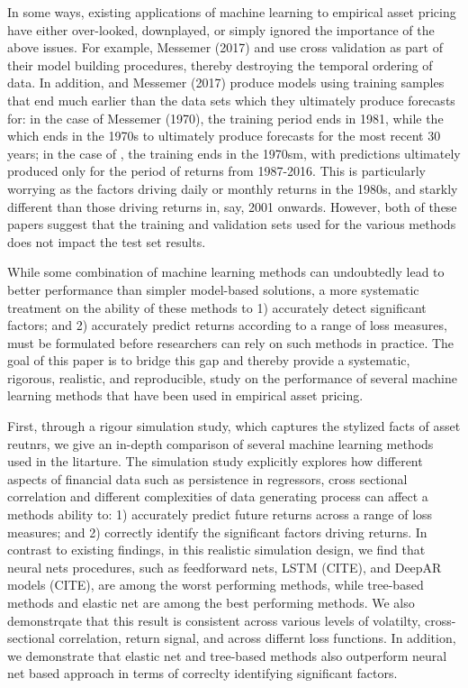 \documentclass{article}
\begin{document}
In some ways, existing applications of machine learning to empirical asset pricing have either over-looked, downplayed, or simply ignored the importance of the above issues. For example, Messemer (2017) and \cite{feng_deep_2018} use cross validation as part of their model building procedures, thereby destroying the temporal ordering of data. In addition, \cite{gu_empirical_2018} and Messemer (2017) produce models using training samples that end much earlier than the data sets which they ultimately produce forecasts for: in the case of Messemer (1970), the training period ends in 1981, while the  which ends in the 1970s to ultimately produce forecasts for the most recent 30 years; in the case of \cite{gu_empirical_2018}, the training ends in the 1970sm, with predictions ultimately produced only for the period of returns from 1987-2016.  This is particularly worrying as the factors driving daily or monthly returns in the 1980s, and starkly different than those driving returns in, say, 2001 onwards. However, both of these papers suggest that the training and validation sets used for the various methods does not impact the test set results. 


While some combination of machine learning methods can undoubtedly lead to better performance than simpler model-based solutions, a more systematic treatment on the ability of these methods to 1) accurately detect significant factors; and 2) accurately predict returns according to a range of loss measures, must be formulated before researchers can rely on such methods in practice. The goal of this paper is to bridge this gap and thereby provide a systematic, rigorous, realistic, and reproducible, study on the performance of several machine learning methods that have been used in empirical asset pricing. 

First, through a rigour simulation study, which captures the stylized facts of asset reutnrs, we give an in-depth comparison of several machine learning methods used in the litarture. The simulation study explicitly explores how different aspects of financial data such as persistence in regressors, cross sectional correlation and different complexities of data generating process can affect a methods ability to: 1) accurately predict future returns across a range of loss measures; and 2) correctly identify the significant factors driving returns. In contrast to existing findings, in this realistic simulation design, we find that neural nets procedures, such as feedforward nets, LSTM (CITE), and DeepAR models (CITE), are among the worst performing methods, while tree-based methods and elastic net are among the best performing methods. We also demonstrqate that this result is consistent across various levels of volatilty, cross-sectional correlation, return signal, and across differnt loss functions. In addition, we demonstrate that elastic net and tree-based methods also outperform neural net based approach in terms of correclty identifying significant factors.     
\end{document}
